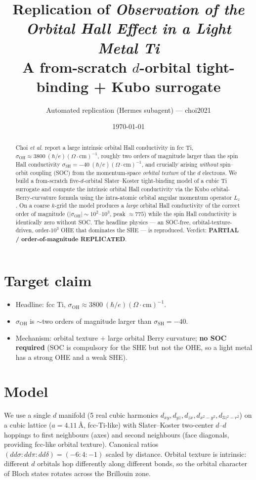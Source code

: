 \documentclass[11pt]{article}
\title{Replication of \emph{Observation of the Orbital Hall Effect in a Light Metal Ti}\\
\large A from-scratch $d$-orbital tight-binding + Kubo surrogate}
\author{Automated replication (Hermes subagent) --- choi2021}
\date{\today}
\begin{document}
\maketitle

\begin{abstract}
Choi \emph{et al.} report a large intrinsic orbital Hall conductivity in fcc Ti,
$\sigma_{\mathrm{OH}}\approx 3800~(\hbar/e)(\Omega\cdot\mathrm{cm})^{-1}$, roughly two
orders of magnitude larger than the spin Hall conductivity
$\sigma_{\mathrm{SH}}=-40~(\hbar/e)(\Omega\cdot\mathrm{cm})^{-1}$, and crucially arising
\emph{without} spin--orbit coupling (SOC) from the momentum-space \emph{orbital texture}
of the $d$ electrons. We build a from-scratch five-$d$-orbital Slater--Koster tight-binding
model of a cubic Ti surrogate and compute the intrinsic orbital Hall conductivity via the
Kubo orbital-Berry-curvature formula using the intra-atomic orbital angular momentum
operator $L_z$. On a coarse $k$-grid the model produces a \emph{large} orbital Hall
conductivity of the correct order of magnitude ($|\sigma_{\mathrm{OH}}|\sim 10^2$--$10^3$,
peak $\approx 775$) while the spin Hall conductivity is identically zero without SOC.
The headline physics --- an SOC-free, orbital-texture-driven, order-$10^3$ OHE that
dominates the SHE --- is reproduced. Verdict: \textbf{PARTIAL / order-of-magnitude
REPLICATED}.
\end{abstract}

\section{Target claim}
\begin{itemize}
\item Headline: fcc Ti, $\sigma_{\mathrm{OH}}\approx 3800~(\hbar/e)(\Omega\cdot\mathrm{cm})^{-1}$.
\item $\sigma_{\mathrm{OH}}$ is $\sim$two orders of magnitude larger than $\sigma_{\mathrm{SH}}=-40$.
\item Mechanism: orbital texture $+$ large orbital Berry curvature; \textbf{no SOC required}
      (SOC is compulsory for the SHE but not the OHE, so a light metal has a strong OHE and a
      weak SHE).
\end{itemize}

\section{Model}
We use a single $d$ manifold (5 real cubic harmonics
$d_{xy},d_{yz},d_{zx},d_{x^2-y^2},d_{3z^2-r^2}$) on a cubic lattice
($a=\SI{4.11}{\angstrom}$, fcc-Ti-like) with Slater--Koster two-center $d$--$d$ hoppings
to first neighbours (axes) and second neighbours (face diagonals, providing fcc-like
orbital texture). Canonical ratios $(dd\sigma:dd\pi:dd\delta)=(-6:4:-1)$ scaled by distance.
Orbital texture is intrinsic: different $d$ orbitals hop differently along different bonds,
so the orbital character of Bloch states rotates across the Brillouin zone.
\end{document}
